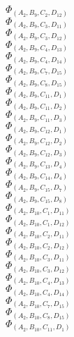 \documentclass[14pt]{article}
\begin{document}
    $\Phi_{({A}_{2}, {B}_{9}, {C}_{2}, {D}_{12})}$ \\ 
    $\Phi_{({A}_{2}, {B}_{9}, {C}_{3}, {D}_{11})}$ \\ 
    $\Phi_{({A}_{2}, {B}_{9}, {C}_{3}, {D}_{12})}$ \\ 
    $\Phi_{({A}_{2}, {B}_{9}, {C}_{4}, {D}_{13})}$ \\ 
    $\Phi_{({A}_{2}, {B}_{9}, {C}_{4}, {D}_{14})}$ \\ 
    $\Phi_{({A}_{2}, {B}_{9}, {C}_{7}, {D}_{15})}$ \\ 
    $\Phi_{({A}_{2}, {B}_{9}, {C}_{8}, {D}_{15})}$ \\ 
    $\Phi_{({A}_{2}, {B}_{9}, {C}_{11}, {D}_{1})}$ \\ 
    $\Phi_{({A}_{2}, {B}_{9}, {C}_{11}, {D}_{2})}$ \\ 
    $\Phi_{({A}_{2}, {B}_{9}, {C}_{11}, {D}_{3})}$ \\ 
    $\Phi_{({A}_{2}, {B}_{9}, {C}_{12}, {D}_{1})}$ \\ 
    $\Phi_{({A}_{2}, {B}_{9}, {C}_{12}, {D}_{2})}$ \\ 
    $\Phi_{({A}_{2}, {B}_{9}, {C}_{12}, {D}_{3})}$ \\ 
    $\Phi_{({A}_{2}, {B}_{9}, {C}_{13}, {D}_{4})}$ \\ 
    $\Phi_{({A}_{2}, {B}_{9}, {C}_{14}, {D}_{4})}$ \\ 
    $\Phi_{({A}_{2}, {B}_{9}, {C}_{15}, {D}_{7})}$ \\ 
    $\Phi_{({A}_{2}, {B}_{9}, {C}_{15}, {D}_{8})}$ \\ 
    $\Phi_{({A}_{2}, {B}_{10}, {C}_{1}, {D}_{11})}$ \\ 
    $\Phi_{({A}_{2}, {B}_{10}, {C}_{1}, {D}_{12})}$ \\ 
    $\Phi_{({A}_{2}, {B}_{10}, {C}_{2}, {D}_{11})}$ \\ 
    $\Phi_{({A}_{2}, {B}_{10}, {C}_{2}, {D}_{12})}$ \\ 
    $\Phi_{({A}_{2}, {B}_{10}, {C}_{3}, {D}_{11})}$ \\ 
    $\Phi_{({A}_{2}, {B}_{10}, {C}_{3}, {D}_{12})}$ \\ 
    $\Phi_{({A}_{2}, {B}_{10}, {C}_{4}, {D}_{13})}$ \\ 
    $\Phi_{({A}_{2}, {B}_{10}, {C}_{4}, {D}_{14})}$ \\ 
    $\Phi_{({A}_{2}, {B}_{10}, {C}_{7}, {D}_{15})}$ \\ 
    $\Phi_{({A}_{2}, {B}_{10}, {C}_{8}, {D}_{15})}$ \\ 
    $\Phi_{({A}_{2}, {B}_{10}, {C}_{11}, {D}_{1})}$ \\ 
\end{document}
